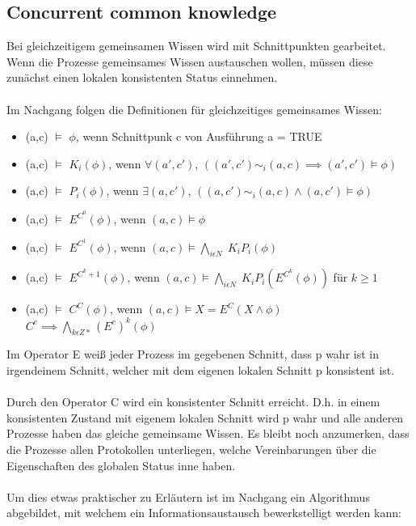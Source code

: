 \subsection{Concurrent common knowledge}
\label{concurrent_comm_know}
Bei gleichzeitigem gemeinsamen Wissen wird mit Schnittpunkten gearbeitet. Wenn die Prozesse gemeinsames Wissen austauschen wollen, müssen diese zunächst einen lokalen konsistenten Status einnehmen. \\\\
Im Nachgang folgen die Definitionen für gleichzeitiges gemeinsames Wissen:
	\begin{itemize}
			\item (a,c)	$\models$ $\phi$, wenn Schnittpunk c von Ausführung a = TRUE
			\item (a,c)	$\models$ $K_i(\phi)$, wenn $\forall(a',c')$, $((a',c') \sim_i (a,c) \implies (a',c') \models \phi)$
			\item (a,c)	$\models$ $P_i(\phi)$, wenn $\exists(a,c')$, $((a,c') \sim_i (a,c) \wedge (a,c') \models \phi)$
			\item (a,c)	$\models$ $E^{C^0}(\phi)$, wenn $(a,c) \models \phi$
			\item (a,c)	$\models$ $E^{C^1}(\phi)$, wenn $(a,c) \models \bigwedge_{i\epsilon N}\; K_i P_i(\phi)$
			\item (a,c)	$\models$ $E^{C^k+1}(\phi)$, wenn $(a,c) \models \bigwedge_{i\epsilon N}\; K_i P_i(E^{C^k}(\phi))$ für $k \geq 1$
			\item (a,c)	$\models$ $C^C(\phi)$, wenn $(a,c) \models X = E^C(X \wedge \phi)$ 
			$C^c \implies \bigwedge_{k\epsilon Z*}(E^c)^k(\phi) $ 
		\end{itemize}
Im Operator E  weiß jeder Prozess im gegebenen Schnitt, dass p wahr ist in irgendeinem Schnitt, welcher mit dem eigenen lokalen Schnitt p konsistent ist. \\\\ 
Durch den Operator C wird ein konsistenter Schnitt erreicht. D.h. in einem konsistenten Zustand mit eigenem lokalen Schnitt wird p wahr und alle anderen Prozesse haben das gleiche gemeinsame Wissen. Es bleibt noch anzumerken, dass die Prozesse allen Protokollen unterliegen, welche Vereinbarungen über die Eigenschaften des globalen Status inne haben. \\\\
Um dies etwas praktischer zu Erläutern ist im Nachgang ein Algorithmus abgebildet, mit welchem ein Informationsaustausch bewerkstelligt werden kann: 


